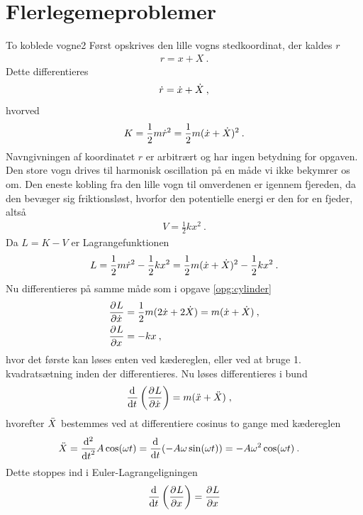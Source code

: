 \section*{Flerlegemeproblemer}
%
%
\begin{opgave}{To koblede vogne}{2}
\opg Først opskrives den lille vogns stedkoordinat, der kaldes $r$
\begin{align*}
	r = x + X \: .
\end{align*}
Dette differentieres
\begin{align*}
	\dt{r} = \dt{x} + \dt{X} \: ,
\end{align*}
hvorved
\begin{align*}
	K = \frac{1}{2}m\dt{r}^2 = \frac{1}{2}m(\dt{x} + \dt{X})^2 \: .
\end{align*}
Navngivningen af koordinatet $r$ er arbitrært og har ingen betydning for opgaven.
\opg Den store vogn drives til harmonisk oscillation på en måde vi ikke bekymrer os om. Den eneste kobling fra den lille vogn til omverdenen er igennem fjereden, da den bevæger sig friktionsløst, hvorfor den potentielle energi er den for en fjeder, altså
\begin{align*}
	V = \frac{1}{2}kx^2 \: .
\end{align*}
Da $L = K - V$ er Lagrangefunktionen
\begin{align*}
	L = \frac{1}{2}m\dt{r}^2 - \frac{1}{2}kx^2 = \frac{1}{2}m(\dt{x} + \dt{X})^2 - \frac{1}{2}kx^2 \: .
\end{align*}
\opg Nu differentieres på samme måde som i opgave \ref{opg:cylinder}
\begin{align*}
	\pdif{\dt{x}}{L} &= \frac{1}{2}m(2\dt{x} + 2\dt{X}) = m(\dt{x} + \dt{X}) \: , \\
	\pdif{x}{L} &= -kx \: ,
\end{align*}
hvor det første kan løses enten ved kædereglen, eller ved at bruge 1. kvadratsætning inden der differentieres.
\opg Nu løses differentieres i bund
\begin{align*}
	\el{\dt{x}} &= m(\ddt{x} + \ddt{X}) \; ,
\end{align*}
hvorefter $\ddt{X}$ bestemmes ved at differentiere cosinus to gange med kædereglen
\begin{align*}
	\ddt{X} &= \dif[2]{t}{}A\cos(\omega t) = \dif{t}{}(-A\omega\sin(\omega t)) = -A\omega^2\cos(\omega t) \: .
\end{align*}
Dette stoppes ind i Euler-Lagrangeligningen
\begin{align*}
	\el{x} &= \pdif{x}{L} \\

\end{align*}
\end{opgave}

